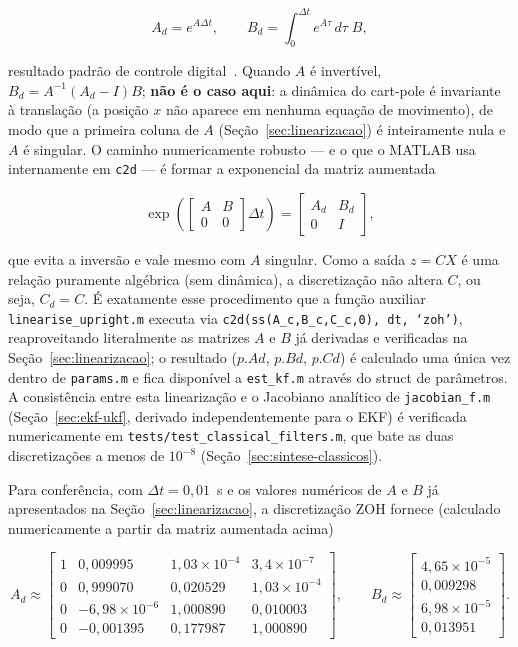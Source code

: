 \documentclass[brazil, 12pt]{article}
\begin{document}
\[
A_d = e^{A\Delta t}, \qquad
B_d = \int_0^{\Delta t} e^{A\tau}\,d\tau\;B,
\]

resultado padrão de controle digital~\cite{simon2006}.
Quando $A$ é invertível, $B_d = A^{-1}(A_d - I)B$; \textbf{não é o caso aqui}: a
dinâmica do cart-pole é invariante à translação (a posição $x$ não aparece em
nenhuma equação de movimento), de modo que a primeira coluna de $A$
(Seção~\ref{sec:linearizacao}) é inteiramente nula e $A$ é singular. O caminho
numericamente robusto — e o que o MATLAB usa internamente em \texttt{c2d} — é
formar a exponencial da matriz aumentada~\cite{simon2006}

\[
\exp\!\left(
\begin{bmatrix} A & B \\ 0 & 0 \end{bmatrix}\Delta t
\right)
=
\begin{bmatrix} A_d & B_d \\ 0 & I \end{bmatrix},
\]

que evita a inversão e vale mesmo com $A$ singular. Como a saída $z=CX$ é uma
relação puramente algébrica (sem dinâmica), a discretização não altera $C$, ou
seja, $C_d = C$. É exatamente esse procedimento que a função auxiliar
\texttt{linearise\_upright.m} executa via
\texttt{c2d(ss(A\_c,B\_c,C\_c,0), dt, `zoh')}, reaproveitando literalmente as
matrizes $A$ e $B$ já derivadas e verificadas na Seção~\ref{sec:linearizacao};
o resultado ($p.Ad$, $p.Bd$, $p.Cd$) é calculado uma única vez dentro de
\texttt{params.m} e fica disponível a \texttt{est\_kf.m} através do struct de
parâmetros. A consistência entre esta linearização e o Jacobiano analítico de
\texttt{jacobian\_f.m} (Seção~\ref{sec:ekf-ukf}, derivado independentemente
para o EKF) é verificada numericamente em
\texttt{tests/test\_classical\_filters.m}, que bate as duas discretizações a
menos de $10^{-8}$ (Seção~\ref{sec:sintese-classicos}).

Para conferência, com $\Delta t = 0{,}01$~s e os valores numéricos de $A$ e $B$
já apresentados na Seção~\ref{sec:linearizacao}, a discretização ZOH fornece
(calculado numericamente a partir da matriz aumentada acima)

\[
A_d \approx
\begin{bmatrix}
1 & 0{,}009995 & 1{,}03\times10^{-4} & 3{,}4\times10^{-7} \\
0 & 0{,}999070 & 0{,}020529          & 1{,}03\times10^{-4} \\
0 & -6{,}98\times10^{-6} & 1{,}000890 & 0{,}010003 \\
0 & -0{,}001395 & 0{,}177987          & 1{,}000890
\end{bmatrix},
\qquad
B_d \approx
\begin{bmatrix}
4{,}65\times10^{-5} \\ 0{,}009298 \\ 6{,}98\times10^{-5} \\ 0{,}013951
\end{bmatrix}.
\]
\end{document}
